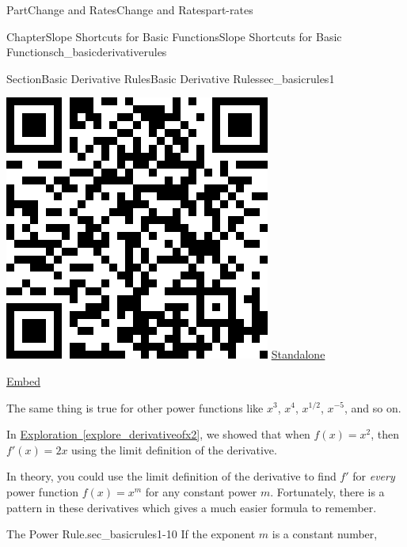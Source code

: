 \documentclass[oneside,10pt,]{tufte-book}
\newcommand{\xreffont}{\relax}
\numberwithin{equation}{chapter}
\begin{document}
\begin{partptx}{Part}{Change and Rates}{}{Change and Rates}{}{}{part-rates}
\begin{chapterptx}{Chapter}{Slope Shortcuts for Basic Functions}{}{Slope Shortcuts for Basic Functions}{}{}{ch_basicderivativerules}
\begin{sectionptx}{Section}{Basic Derivative Rules}{}{Basic Derivative Rules}{}{}{sec_basicrules1}
\begin{sidebyside}{2}{0.075}{0.075}{0.17}
\begin{sbspanel}{0.47}
\end{sbspanel}%
\begin{sbspanel}{0.21}%
\includegraphics[width=\linewidth]{generated/qrcode/sec_basicrules1-7-6.png}
\href{http://webwork.bridgew.edu/oer/functions_at_work/sec_basicrules1-7-6.html}{Standalone}%
\par
\href{http://webwork.bridgew.edu/oer/functions_at_work/sec_basicrules1-7-6-if.html}{Embed}%
\end{sbspanel}%
\end{sidebyside}%
 The same thing is true for other power functions like \(x^3\), \(x^4\), \(x^{1/2}\), \(x^{-5}\), and so on.%
\par
In \hyperref[explore_derivativeofx2]{Exploration~{\xreffont\ref{explore_derivativeofx2}}}, we showed that when \(f(x) = x^2\), then \(f'(x) = 2x\) using the limit definition of the derivative.%
\par
In theory, you could use the limit definition of the derivative to find \(f'\) for \emph{every} power function \(f(x) = x^m\) for any constant power \(m\). Fortunately, there is a pattern in these derivatives which gives a much easier formula to remember.%
\begin{paragraphs}{The Power Rule.}{sec_basicrules1-10}%
If the exponent \(m\) is a constant number,%
\begin{equation*}

\end{equation*}
\end{paragraphs}
\end{sectionptx}
\end{chapterptx}
\end{partptx}
\end{document}

